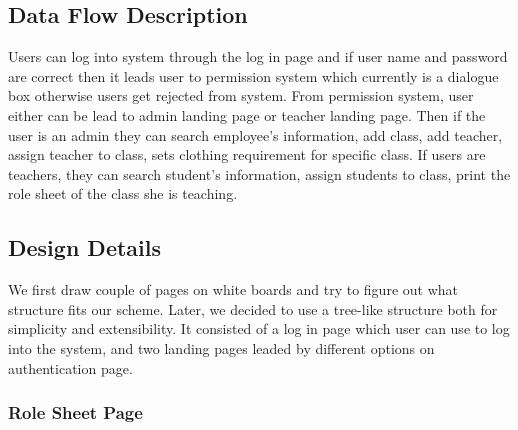 \subsection{Data Flow Description}
Users can log into system through the log in page and if user name and password are correct then it leads user to permission system which currently is a dialogue box otherwise users get rejected from system. From permission system, user either can be lead to admin landing page or teacher landing page. Then if the user is an admin they can search employee's information, add class, add teacher, assign teacher to class, sets clothing requirement for specific class. If users are teachers, they can search student's information, assign students to class, print the role sheet of the class she is teaching. 

\subsection{Design Details}
We first draw couple of pages on white boards and try to figure out what structure fits our scheme. Later, we decided to use a tree-like structure both for simplicity and extensibility. It consisted of a log in page which user can use to log into the system, and two landing pages leaded by different options on authentication page. 

\subsubsection{Role Sheet Page}

